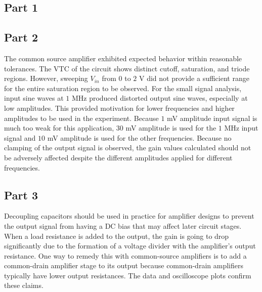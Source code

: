 \subsection{Part 1}


\subsection{Part 2}
The common source amplifier exhibited expected behavior within reasonable tolerances.
The VTC of the circuit shows distinct cutoff, saturation, and triode regions.
However, sweeping $V_{in}$ from $0$ to $2$ \si{\volt} did not provide a sufficient range for the entire saturation region to be observed. 
For the small signal analysis, input sine waves at $1$ \si{\mega\hertz} produced distorted output sine waves, especially at low amplitudes. 
This provided motivation for lower frequencies and higher amplitudes to be used in the experiment.
Because $1$ \si{\milli\volt} amplitude input signal is much too weak for this application, $30$ \si{\milli\volt} amplitude is used for the $1$ \si{\mega\hertz} input signal and $10$ \si{\milli\volt} amplitude is used for the other frequencies.
Because no clamping of the output signal is observed, the gain values calculated should not be adversely affected despite the different amplitudes applied for different frequencies.

\subsection{Part 3}
Decoupling capacitors should be used in practice for amplifier designs to prevent the output signal from having a DC bias that may affect later circuit stages.
When a load resistance is added to the output, the gain is going to drop significantly due to the formation of a voltage divider with the amplifier's output resistance.
One way to remedy this with common-source amplifiers is to add a common-drain amplifier stage to its output because common-drain amplifiers typically have lower output resistances.
The data and oscilloscope plots confirm these claims.
